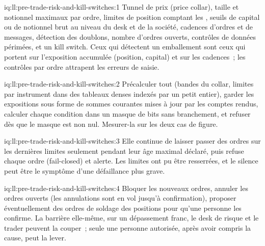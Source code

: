 \begin{solution}{iq:ll:pre-trade-risk-and-kill-switches:1}
Tunnel de prix (price collar), taille et notionnel maximaux par ordre, limites de position comptant les , seuils de capital ou de notionnel brut
au niveau du desk et de la société, cadences d'ordres et de messages, détection des doublons, nombre d'ordres ouverts, contrôles de données périmées, et un
kill switch. Ceux qui détectent un emballement sont ceux qui portent sur l'exposition accumulée (position, capital) et sur les cadences~; les contrôles par ordre
attrapent les erreurs de saisie.
\end{solution}

\begin{solution}{iq:ll:pre-trade-risk-and-kill-switches:2}
Précalculer tout (bandes du collar, limites par instrument dans des tableaux denses indexés par un petit entier), garder les expositions sous forme de
sommes courantes mises à jour par les comptes rendus, calculer chaque condition dans un masque de bits sans branchement, et refuser dès que le masque est non nul. Mesurer-la
sur les deux cas de figure.
\end{solution}

\begin{solution}{iq:ll:pre-trade-risk-and-kill-switches:3}
Elle continue de laisser passer des ordres sur les dernières limites seulement pendant leur âge maximal déclaré, puis refuse chaque ordre (fail-closed) et alerte. Les
limites ont pu être resserrées, et le silence peut être le symptôme d'une défaillance plus grave.
\end{solution}

\begin{solution}{iq:ll:pre-trade-risk-and-kill-switches:4}
Bloquer les nouveaux ordres, annuler les ordres ouverts (les annulations sont en vol jusqu'à confirmation), proposer éventuellement des ordres de soldage des positions pour
qu'une personne les confirme. La barrière elle-même, sur un dépassement franc, le desk de risque et le trader peuvent la couper~; seule une personne autorisée, après
avoir compris la cause, peut la lever.
\end{solution}

